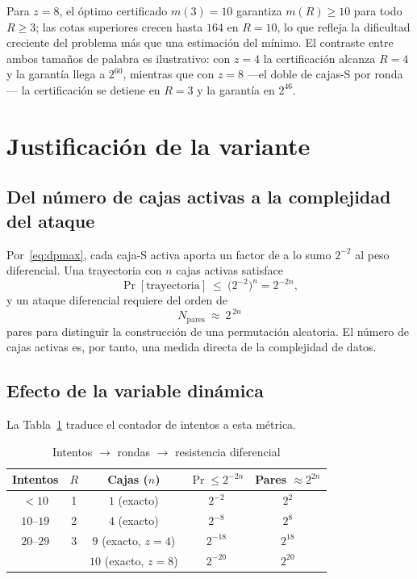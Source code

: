 \documentclass[conference]{IEEEtran}
\begin{document}
Para $z=8$, el óptimo certificado $m(3)=10$ garantiza $m(R)\ge10$ para todo $R\ge3$; las
cotas superiores crecen hasta $164$ en $R=10$, lo que refleja la dificultad creciente del
problema más que una estimación del mínimo. El contraste entre ambos tamaños de palabra es
ilustrativo: con $z=4$ la certificación alcanza $R=4$ y la garantía llega a $2^{60}$,
mientras que con $z=8$ ---el doble de cajas-S por ronda--- la certificación se detiene en
$R=3$ y la garantía en $2^{46}$.

\section{Justificación de la variante}\label{sec:justificacion}

\subsection{Del número de cajas activas a la complejidad del ataque}

Por~\eqref{eq:dpmax}, cada caja-S activa aporta un factor de a lo sumo $2^{-2}$ al peso
diferencial. Una trayectoria con $n$ cajas activas satisface
\begin{equation}
\Pr[\text{trayectoria}]\ \le\ \bigl(2^{-2}\bigr)^{n}=2^{-2n},
\end{equation}
y un ataque diferencial requiere del orden de
\begin{equation}
N_{\text{pares}}\ \approx\ 2^{\,2n}
\end{equation}
pares para distinguir la construcción de una permutación aleatoria. El número de cajas
activas es, por tanto, una medida directa de la complejidad de datos.

\subsection{Efecto de la variable dinámica}

La Tabla~\ref{tab:seg} traduce el contador de intentos a esta métrica.

\begin{table}[t]
\caption{Intentos $\to$ rondas $\to$ resistencia diferencial}
\label{tab:seg}
\centering
\begin{tabular}{@{}ccccc@{}}
\toprule
Intentos & $R$ & Cajas ($n$) & $\Pr\le 2^{-2n}$ & Pares $\approx 2^{2n}$ \\
\midrule
$<10$      & 1 & $1$ (exacto)          & $2^{-2}$        & $2^{2}$ \\
$10$--$19$ & 2 & $4$ (exacto)          & $2^{-8}$        & $2^{8}$ \\
$20$--$29$ & 3 & $9$ (exacto, $z{=}4$) & $2^{-18}$       & $2^{18}$ \\
           &   & $10$ (exacto, $z{=}8$) & $2^{-20}$      & $2^{20}$ \\
\bottomrule
\end{tabular}
\end{table}
\end{document}
